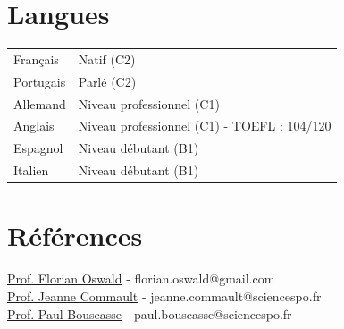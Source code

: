 \documentclass[a4paper,12pt]{article}
\begin{document}
\section{Langues}
\begin{tabularx}{\linewidth}{@{}l X@{}}
Français &  \normalsize{Natif (C2)}\\
Portugais &  \normalsize{Parlé (C2)}\\
Allemand &  \normalsize{Niveau professionnel (C1)}\\  
Anglais &  \normalsize{Niveau professionnel (C1) - TOEFL : 104/120}\\ 
Espagnol & \normalsize{Niveau débutant (B1)}\\ 
Italien & \normalsize{Niveau débutant (B1)}\\ 
\end{tabularx}

\section{Références}

\href{https://floswald.github.io}{Prof. Florian Oswald} - florian.oswald@gmail.com \\
\href{https://www.jcommault.com}{Prof. Jeanne Commault} - jeanne.commault@sciencespo.fr \\
\href{https://www.paul-bouscasse.com}{Prof. Paul Bouscasse} - paul.bouscasse@sciencespo.fr \\

\vfill
{}
\end{document}
